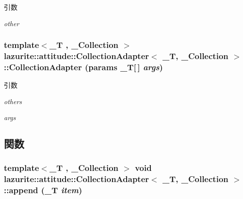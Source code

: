 \begin{DoxyParams}{引数}
\item[{\em other}]\end{DoxyParams}
\hypertarget{classlazurite_1_1attitude_1_1_collection_adapter_3_01___t_00_01___collection_01_4_aaad30d466620c011afbc38890a7902ad}{
\subsubsection[{CollectionAdapter}]{\setlength{\rightskip}{0pt plus 5cm}template$<$\_\-T , \_\-Collection $>$ lazurite::attitude::CollectionAdapter$<$ \_\-T, \_\-Collection $>$::CollectionAdapter (params \_\-T\mbox{[}$\,$\mbox{]} {\em args})}}
\label{classlazurite_1_1attitude_1_1_collection_adapter_3_01___t_00_01___collection_01_4_aaad30d466620c011afbc38890a7902ad}

\begin{DoxyParams}{引数}
\item[{\em others}]\item[{\em args}]\end{DoxyParams}


\subsection{関数}
\hypertarget{classlazurite_1_1attitude_1_1_collection_adapter_3_01___t_00_01___collection_01_4_a6b26e05bd526881846bd66c016c770c7}{
\subsubsection[{append}]{\setlength{\rightskip}{0pt plus 5cm}template$<$\_\-T , \_\-Collection $>$ void lazurite::attitude::CollectionAdapter$<$ \_\-T, \_\-Collection $>$::append (\_\-T {\em item})}}
\label{classlazurite_1_1attitude_1_1_collection_adapter_3_01___t_00_01___collection_01_4_a6b26e05bd526881846bd66c016c770c7}

